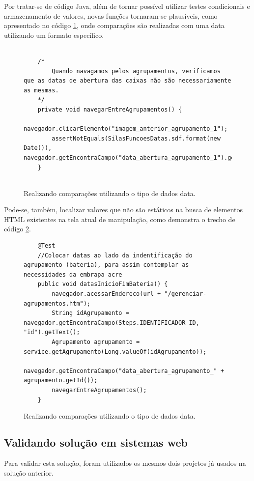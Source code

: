 \documentclass[tg]{mdtufsm}
\begin{document}
Por tratar-se de código Java, além de tornar possível utilizar testes condicionais e armazenamento de valores, novas funções tornaram-se plausíveis, como apresentado no código \ref{code:seleniumDate}, onde comparações são realizadas com uma data utilizando um formato específico.

\begin{figure}[!htt]
	\begin{lstlisting}

	/*
		Quando navagamos pelos agrupamentos, verificamos que as datas de abertura das caixas não são necessariamente as mesmas.
	*/		
	private void navegarEntreAgrupamentos() {
		navegador.clicarElemento("imagem_anterior_agrupamento_1");
		assertNotEquals(SilasFuncoesDatas.sdf.format(new Date()), navegador.getEncontraCampo("data_abertura_agrupamento_1").getText());
	}
	
	\end{lstlisting}
	\caption{Realizando comparações utilizando o tipo de dados data.}
	\label{code:seleniumDate}
\end{figure}

Pode-se, também, localizar valores que não são estáticos na busca de elementos HTML existentes na tela atual de manipulação, como demonstra o trecho de código \ref{code:seleniumBuscaId}.

\begin{figure}[!htt]
	\begin{lstlisting}
	@Test
	//Colocar datas ao lado da indentificação do agrupamento (bateria), para assim contemplar as necessidades da embrapa acre
	public void datasInicioFimBateria() {
		navegador.acessarEndereco(url + "/gerenciar-agrupamentos.htm");
		String idAgrupamento = navegador.getEncontraCampo(Steps.IDENTIFICADOR_ID, "id").getText();
		Agrupamento agrupamento = service.getAgrupamento(Long.valueOf(idAgrupamento));
		navegador.getEncontraCampo("data_abertura_agrupamento_" + agrupamento.getId());
		navegarEntreAgrupamentos();
	}	
	\end{lstlisting}
	\caption{Realizando comparações utilizando o tipo de dados data.}
	\label{code:seleniumBuscaId}
\end{figure}


\subsection{Validando solução em sistemas web}
Para validar esta solução, foram utilizados os mesmos dois projetos já usados na solução anterior.
\end{document}
